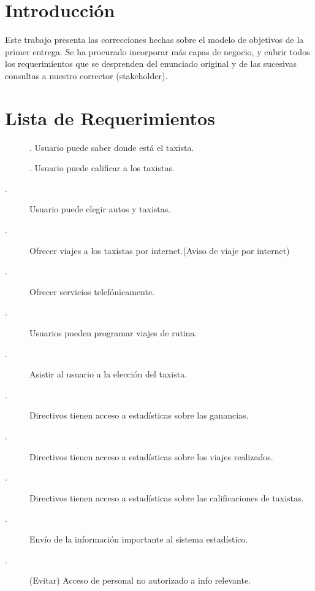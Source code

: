 \section{Introducción}

Este trabajo presenta las correcciones hechas sobre el modelo de objetivos de la primer entrega. Se ha procurado incorporar más capas de negocio, y cubrir todos los requerimientos que se desprenden del enunciado original y de las sucesivas consultas a nuestro corrector (stakeholder).

\section{Lista de Requerimientos}
	\begin{description}
		\item []. Usuario puede saber donde está el taxista.		
		\item []. Usuario puede calificar a los taxistas.		
		\item [.] Usuario puede elegir autos y taxistas.		
		\item [.] Ofrecer viajes a los taxistas por internet.(Aviso de viaje por internet)
		\item [.] Ofrecer servicios telefónicamente.		
		\item [.] Usuarios pueden programar viajes de 
		rutina.		
		\item [.] Asistir al usuario a la elección del taxista.		
		\item [.] Directivos tienen acceso a estadísticas sobre las ganancias.
		\item [.] Directivos tienen acceso a estadísticas sobre los viajes realizados.
		\item [.] Directivos tienen acceso a estadísticas sobre las calificaciones de taxistas.
		\item [.] Envío de la información importante al sistema estadístico.
		\item [.] (Evitar) Acceso de personal no autorizado a info relevante.
		

\end{description}
